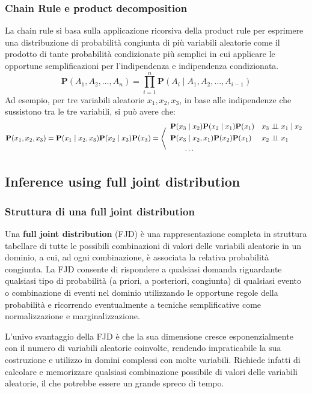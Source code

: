 \subsubsection*{Chain Rule e product decomposition}
La chain rule si basa sulla applicazione ricorsiva della product rule per esprimere una distribuzione di probabilità congiunta
di più variabili aleatorie come il prodotto di tante probabilità condizionate più semplici in cui applicare le opportune
semplificazioni per l'indipendenza e indipendenza condizionata.
\[\textbf{P}(A_1, A_2, \ldots, A_n) = \prod_{i=1}^{n} \textbf{P}(A_i \mid A_1, A_2, \ldots, A_{i-1})\]
Ad esempio, per tre variabili aleatorie \(x_1, x_2, x_3\), in base alle indipendenze che sussistono tra le tre variabili,
si può avere che:
\[\textbf{P}(x_1, x_2, x_3) = \textbf{P}(x_1 \mid x_2, x_3) \textbf{P}(x_2 \mid x_3) \textbf{P}(x_3) =  \left\langle \begin{array}{l l}
	\textbf{P}(x_3 \mid x_2) \textbf{P}(x_2 \mid x_1) \textbf{P}(x_1) & x_3 \perp \!\!\! \perp x_1 \mid x_2 \\[4pt]
	\textbf{P}(x_3 \mid x_2, x_1) \textbf{P}(x_2) \textbf{P}(x_1) & x_2 \perp \!\!\! \perp x_1 \\[4pt]
	\qquad \cdots
\end{array} \right.\]

\subsection{Inference using full joint distribution}
\subsubsection*{Struttura di una full joint distribution}
Una \textbf{full joint distribution} (FJD) è una rappresentazione completa in struttura tabellare di tutte le possibili
combinazioni di valori delle variabili aleatorie in un dominio, a cui, ad ogni combinazione, è associata la relativa
probabilità congiunta. La FJD consente di rispondere a qualsiasi domanda riguardante qualsiasi tipo di probabilità (a
priori, a posteriori, congiunta) di qualsiasi evento o combinazione di eventi nel dominio utilizzando le opportune 
regole della probabilità e ricorrendo eventualmente a tecniche semplificative come normalizzazione e marginalizzazione.

L'univo svantaggio della FJD è che la sua dimensione cresce esponenzialmente con il numero di variabili aleatorie
coinvolte, rendendo impraticabile la sua costruzione e utilizzo in domini complessi con molte variabili. Richiede
infatti di calcolare e memorizzare qualsiasi combinazione possibile di valori delle variabili aleatorie, il che
potrebbe essere un grande spreco di tempo.

